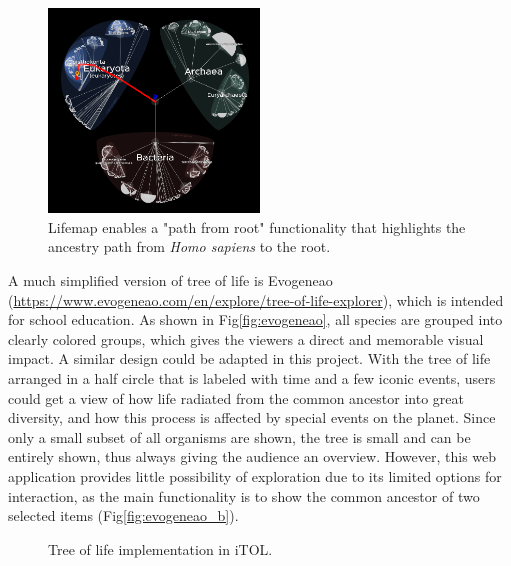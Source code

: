 \documentclass[11pt, a4paper,oneside,chapterprefix=false]{scrbook}
\begin{document}
\begin{figure}[h]
	\centering
	\includegraphics[width=0.5\textwidth]{figures/related_work/lifemap}
	\caption{Lifemap enables a "path from root" functionality that highlights the ancestry path from \textit{Homo sapiens} to the root. }
	\label{fig:lifemap}
\end{figure}

A much simplified version of tree of life is Evogeneao (\url{https://www.evogeneao.com/en/explore/tree-of-life-explorer}), which is intended for school education. As shown in Fig\ref{fig:evogeneao}, all species are grouped into clearly colored groups, which gives the viewers a direct and memorable visual impact. A similar design could be adapted in this project. With the tree of life arranged in a half circle that is labeled with time and a few iconic events, users could get a view of how life radiated from the common ancestor into great diversity, and how this process is affected by special events on the planet. Since only a small subset of all organisms are shown, the tree is small and can be entirely shown, thus always giving the audience an overview. However, this web application provides little possibility of exploration due to its limited options for interaction, as the main functionality is to show the common ancestor of two selected items (Fig\ref{fig:evogeneao_b}).

\begin{figure}[h]
	\centering
	\hfill
	\caption{Tree of life implementation in iTOL. }
	\label{fig:iTOL}
\end{figure}
\end{document}
